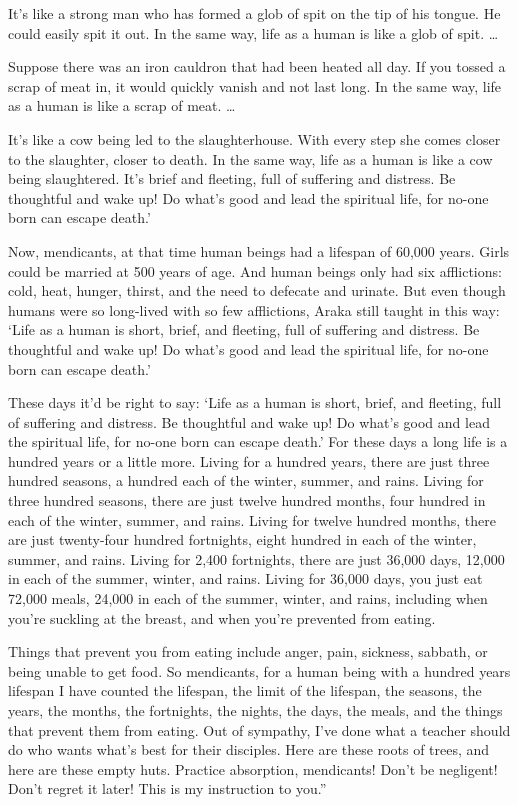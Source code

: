 \documentclass[12pt,openany]{book}%
\begin{document}
It’s like a strong man who has formed a glob of spit on the tip of his tongue. He could easily spit it out. In the same way, life as a human is like a glob of spit. … 

Suppose there was an iron cauldron that had been heated all day. If you tossed a scrap of meat in, it would quickly vanish and not last long. In the same way, life as a human is like a scrap of meat. … 

It’s like a cow being led to the slaughterhouse. With every step she comes closer to the slaughter, closer to death. In the same way, life as a human is like a cow being slaughtered. It’s brief and fleeting, full of suffering and distress. Be thoughtful and wake up! Do what’s good and lead the spiritual life, for no-one born can escape death.’ 

Now, mendicants, at that time human beings had a lifespan of 60,000 years. Girls could be married at 500 years of age. And human beings only had six afflictions: cold, heat, hunger, thirst, and the need to defecate and urinate. But even though humans were so long-lived with so few afflictions, Araka still taught in this way: ‘Life as a human is short, brief, and fleeting, full of suffering and distress. Be thoughtful and wake up! Do what’s good and lead the spiritual life, for no-one born can escape death.’ 

These days it’d be right to say: ‘Life as a human is short, brief, and fleeting, full of suffering and distress. Be thoughtful and wake up! Do what’s good and lead the spiritual life, for no-one born can escape death.’ For these days a long life is a hundred years or a little more. Living for a hundred years, there are just three hundred seasons, a hundred each of the winter, summer, and rains. Living for three hundred seasons, there are just twelve hundred months, four hundred in each of the winter, summer, and rains. Living for twelve hundred months, there are just twenty-four hundred fortnights, eight hundred in each of the winter, summer, and rains. Living for 2,400 fortnights, there are just 36,000 days, 12,000 in each of the summer, winter, and rains. Living for 36,000 days, you just eat 72,000 meals, 24,000 in each of the summer, winter, and rains, including when you’re suckling at the breast, and when you’re prevented from eating. 

Things that prevent you from eating include anger, pain, sickness, sabbath, or being unable to get food. So mendicants, for a human being with a hundred years lifespan I have counted the lifespan, the limit of the lifespan, the seasons, the years, the months, the fortnights, the nights, the days, the meals, and the things that prevent them from eating. Out of sympathy, I’ve done what a teacher should do who wants what’s best for their disciples. Here are these roots of trees, and here are these empty huts. Practice absorption, mendicants! Don’t be negligent! Don’t regret it later! This is my instruction to you.” 
\end{document}
